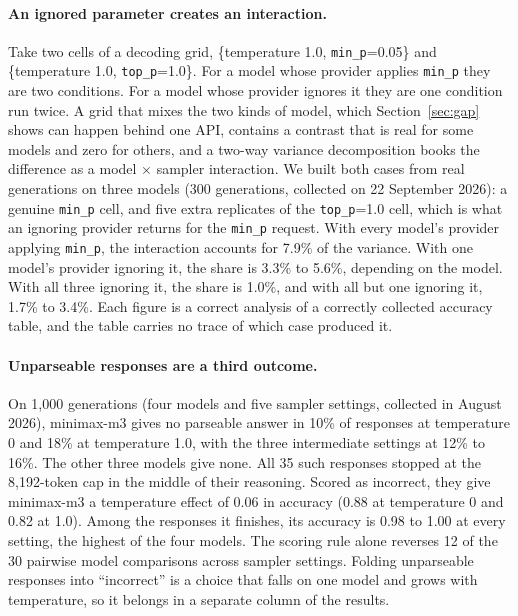 \documentclass[10pt]{article}
\newcommand{\p}[1]{\texttt{#1}}
\begin{document}
\paragraph{An ignored parameter creates an interaction.} Take two cells of a decoding grid, \{temperature 1.0, \p{min\_p}=0.05\} and \{temperature 1.0, \p{top\_p}=1.0\}. For a model whose provider applies \p{min\_p} they are two conditions. For a model whose provider ignores it they are one condition run twice. A grid that mixes the two kinds of model, which Section~\ref{sec:gap} shows can happen behind one API, contains a contrast that is real for some models and zero for others, and a two-way variance decomposition books the difference as a model $\times$ sampler interaction. We built both cases from real generations on three models (300 generations, collected on 22 September 2026): a genuine \p{min\_p} cell, and five extra replicates of the \p{top\_p}=1.0 cell, which is what an ignoring provider returns for the \p{min\_p} request. With every model's provider applying \p{min\_p}, the interaction accounts for 7.9\% of the variance. With one model's provider ignoring it, the share is 3.3\% to 5.6\%, depending on the model. With all three ignoring it, the share is 1.0\%, and with all but one ignoring it, 1.7\% to 3.4\%. Each figure is a correct analysis of a correctly collected accuracy table, and the table carries no trace of which case produced it.

\paragraph{Unparseable responses are a third outcome.} On 1{,}000 generations (four models and five sampler settings, collected in August 2026), minimax-m3 gives no parseable answer in 10\% of responses at temperature 0 and 18\% at temperature 1.0, with the three intermediate settings at 12\% to 16\%. The other three models give none. All 35 such responses stopped at the 8{,}192-token cap in the middle of their reasoning. Scored as incorrect, they give minimax-m3 a temperature effect of 0.06 in accuracy (0.88 at temperature 0 and 0.82 at 1.0). Among the responses it finishes, its accuracy is 0.98 to 1.00 at every setting, the highest of the four models. The scoring rule alone reverses 12 of the 30 pairwise model comparisons across sampler settings. Folding unparseable responses into ``incorrect'' is a choice that falls on one model and grows with temperature, so it belongs in a separate column of the results.
\end{document}
